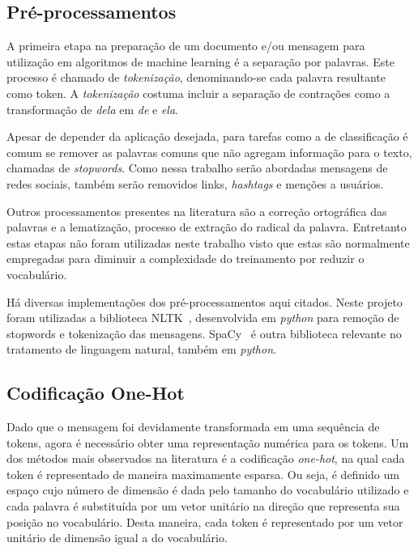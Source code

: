 
\subsection{Pré-processamentos}

A primeira etapa na preparação de um documento e/ou mensagem para utilização em algoritmos de machine learning é a
separação por palavras.
Este processo é chamado de \textit{tokenização}, denominando-se cada palavra resultante como token.
A \textit{tokenização} costuma incluir a separação de contrações como a transformação de \textit{dela} em \textit{de}
e \textit{ela}.

Apesar de depender da aplicação desejada, para tarefas como a de classificação é comum se remover as palavras comuns que
não agregam informação para o texto, chamadas de \textit{stopwords}.
Como nessa trabalho serão abordadas mensagens de redes sociais, também serão removidos links, \textit{hashtags} e menções
a usuários.

Outros processamentos presentes na literatura são a correção ortográfica das palavras e a lematização, processo de
extração do radical da palavra.
Entretanto estas etapas não foram utilizadas neste trabalho visto que estas são normalmente empregadas para diminuir a
complexidade do treinamento por reduzir o vocabulário.

Há diversas implementações dos pré-processamentos aqui citados. Neste projeto foram utilizadas a biblioteca
NLTK~\cite{nltk}, desenvolvida em \textit{python} para remoção de stopwords e tokenização das mensagens.
SpaCy~\cite{spacy} é outra biblioteca relevante no tratamento de linguagem natural, também em \textit{python}.

\subsection{Codificação One-Hot}

Dado que o mensagem foi devidamente transformada em uma sequência de tokens, agora é necessário obter uma representação
numérica para os tokens.
Um dos métodos mais observados na literatura é a codificação \textit{one-hot}, na qual cada token é representado de
maneira maximamente esparsa.
Ou seja, é definido um espaço cujo número de dimensão é dada pelo tamanho do vocabulário utilizado e cada palavra é
substituída por um vetor unitário na direção que representa sua posição no vocabulário.
Desta maneira, cada token é representado por um vetor unitário de dimensão igual a do vocabulário.

